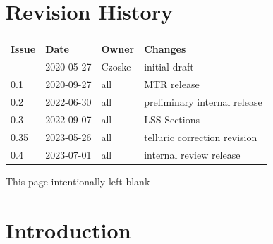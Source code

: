 \documentclass[11pt,oneside,a4paper]{article}
\begin{document}





\clearpage
\pagestyle{fancy}

\section*{Revision History}

\renewcommand{\arraystretch}{1.2}
\begin{tabularx}{\textwidth}{|l|l|l|X|}
  \hline
  \rowcolor{rd1}
  \textbf{Issue} & \textbf{Date} & \textbf{Owner} & \textbf{Changes} \\
  \hline
                 & 2020-05-27    & Czoske         & initial draft    \\
  0.1            & 2020-09-27    & all            & MTR release      \\
  0.2            & 2022-06-30    & all            & preliminary internal release      \\
  0.3            & 2022-09-07    & all  & LSS Sections \\
  0.35           & 2023-05-26    & all   & telluric correction revision \\
  0.4            & 2023-07-01    & all   & internal review release \\
  \hline
\end{tabularx}


\newpage
\tableofcontents
\clearpage
\listoffigures
\clearpage
\listoftables

\clearpage
\phantom{a}
\vfill
\begin{center}
  This page intentionally left blank
\end{center}
\vfill
\clearpage



\section{Introduction}
\label{sec:intro}
\end{document}
